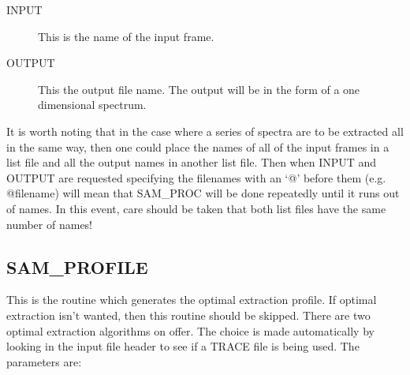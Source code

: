 \begin{description}
\begin{description}

\item[INPUT] This is the name of the input frame.

\item[OUTPUT] This the output file name.  The output will be in the form of a
one dimensional spectrum.

\end{description}
\end{description}

It is worth noting that in the case where a series of spectra are to be
extracted all in the same way, then one could place the names of all of the
input frames in a list file and all the output names in another list file. Then
when INPUT and OUTPUT are requested specifying the filenames with an `@' before
them (e.g. @filename) will mean that SAM\_PROC will be done repeatedly until it
runs out of names.  In this event, care should be taken that both list files
have the same number of names!

\subsection{SAM\_PROFILE}

This is the routine which generates the optimal extraction profile.  If optimal
extraction isn't wanted, then this routine should be skipped.  There are two
optimal extraction algorithms on offer.  The choice is made automatically by
looking in the input file header to see if a TRACE file is being used.  The
parameters are:

